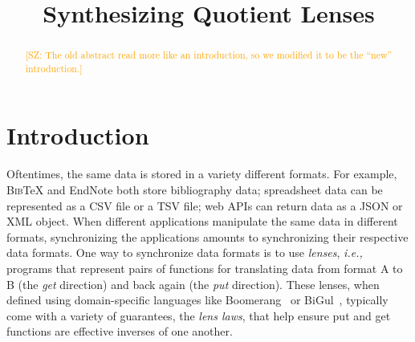 \documentclass[acmsmall,review,anonymous]{acmart}\settopmatter{printfolios=true,printccs=false,printacmref=false}
\newcommand{\FINISH}[3]{\ifdraft\textcolor{#1}{[#2: #3]}\fi}
\newcommand{\saz}[1]{\FINISH{orange}{SZ}{#1}}
\newcommand{\bibtex}{\textsc{Bib}\TeX{}}
\begin{document}
\title{Synthesizing Quotient Lenses}
\begin{abstract}
\saz{The old abstract read more like an introduction, so we modified it to be
the ``new'' introduction.}
\end{abstract}

\maketitle              %

\section{Introduction}

Oftentimes, the same data is stored in a variety different formats. For
example, \bibtex{} and EndNote both store bibliography data; spreadsheet data
can be represented as a CSV file or a TSV file; web APIs can return data as a
JSON or
XML object. When different applications manipulate the same data in different formats,
synchronizing the applications amounts to synchronizing their respective data
formats. One way to synchronize data formats is to use \emph{lenses}, \emph{i.e.,} programs that represent pairs of functions for translating data from
format A to B (the \emph{get} direction) and back again (the \emph{put}
direction).  These lenses, when defined using domain-specific
languages like Boomerang~\cite{boomerang} or
BiGul~\cite{DBLP:conf/pepm/KoZH16}, typically come with a variety of guarantees,
the \emph{lens laws}, that help ensure put and get functions are effective
inverses of one another.  
\end{document}
